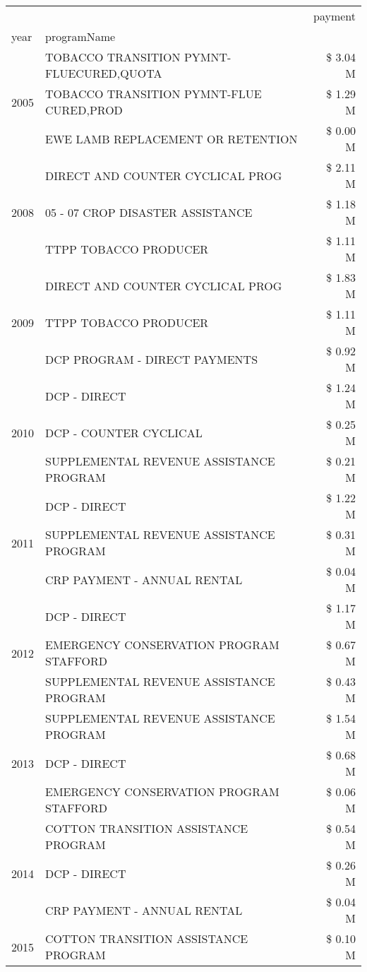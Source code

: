 \begin{tabular}{llr}
\toprule
 &  & payment \\
year & programName &  \\
\midrule
\multirow[t]{3}{*}{2005} & TOBACCO TRANSITION PYMNT-FLUECURED,QUOTA & \$ 3.04 M \\
 & TOBACCO TRANSITION PYMNT-FLUE CURED,PROD & \$ 1.29 M \\
 & EWE LAMB REPLACEMENT OR RETENTION & \$ 0.00 M \\
\cline{1-3}
\multirow[t]{3}{*}{2008} & DIRECT AND COUNTER CYCLICAL PROG & \$ 2.11 M \\
 & 05 - 07 CROP DISASTER ASSISTANCE & \$ 1.18 M \\
 & TTPP TOBACCO PRODUCER & \$ 1.11 M \\
\cline{1-3}
\multirow[t]{3}{*}{2009} & DIRECT AND COUNTER CYCLICAL PROG & \$ 1.83 M \\
 & TTPP TOBACCO PRODUCER & \$ 1.11 M \\
 & DCP PROGRAM - DIRECT PAYMENTS & \$ 0.92 M \\
\cline{1-3}
\multirow[t]{3}{*}{2010} & DCP - DIRECT & \$ 1.24 M \\
 & DCP - COUNTER CYCLICAL & \$ 0.25 M \\
 & SUPPLEMENTAL REVENUE ASSISTANCE PROGRAM & \$ 0.21 M \\
\cline{1-3}
\multirow[t]{3}{*}{2011} & DCP - DIRECT & \$ 1.22 M \\
 & SUPPLEMENTAL REVENUE ASSISTANCE PROGRAM & \$ 0.31 M \\
 & CRP PAYMENT - ANNUAL RENTAL & \$ 0.04 M \\
\cline{1-3}
\multirow[t]{3}{*}{2012} & DCP - DIRECT & \$ 1.17 M \\
 & EMERGENCY CONSERVATION PROGRAM STAFFORD & \$ 0.67 M \\
 & SUPPLEMENTAL REVENUE ASSISTANCE PROGRAM & \$ 0.43 M \\
\cline{1-3}
\multirow[t]{3}{*}{2013} & SUPPLEMENTAL REVENUE ASSISTANCE PROGRAM & \$ 1.54 M \\
 & DCP - DIRECT & \$ 0.68 M \\
 & EMERGENCY CONSERVATION PROGRAM STAFFORD & \$ 0.06 M \\
\cline{1-3}
\multirow[t]{3}{*}{2014} & COTTON TRANSITION ASSISTANCE PROGRAM & \$ 0.54 M \\
 & DCP - DIRECT & \$ 0.26 M \\
 & CRP PAYMENT - ANNUAL RENTAL & \$ 0.04 M \\
\cline{1-3}
\multirow[t]{3}{*}{2015} & COTTON TRANSITION ASSISTANCE PROGRAM & \$ 0.10 M \\

\end{tabular}

